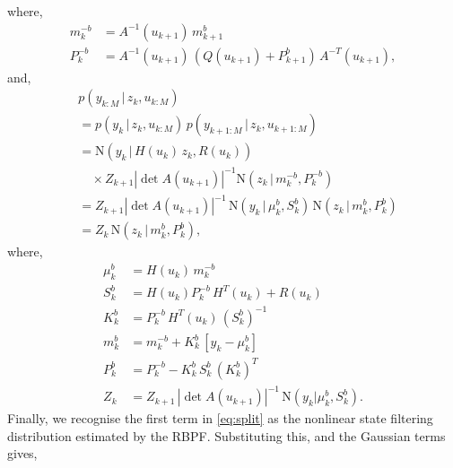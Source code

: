 \documentclass[twocolumn]{autart}    %
\begin{document}
%
where,
%
\begin{equation}
\begin{split}
   m^{-b}_k &= A^{-1}(u_{k+1}) \, m^b_{k+1} \\
   P^{-b}_k &= A^{-1}(u_{k+1}) \, (Q(u_{k+1}) + P^b_{k+1}) \, A^{-T}(u_{k+1}),
\end{split}
\label{eq:bkf_predict}
\end{equation}
%
and,
%
\begin{equation}
\begin{split}
  &p(y_{k:M} \,|\, z_{k},u_{k:M}) \\
  &= p(y_{k} \,|\, z_{k},u_{k:M}) \, p(y_{k+1:M} \,|\, z_{k},u_{k+1:M}) \\
  &= \mathrm{N}(y_{k} \,|\, H(u_k) \, z_k, R(u_k)) \\
  &\quad \times Z_{k+1} |\det A(u_{k+1})|^{-1}
  \mathrm{N}(z_{k} \,|\, m^{-b}_{k}, P^{-b}_{k}) \\
  &= Z_{k+1} |\det A(u_{k+1})|^{-1} \, \mathrm{N}(y_{k} \,|\, \mu^b_k, S^b_k) \,
     \mathrm{N}(z_{k} \,|\, m^{b}_{k}, P^{b}_{k}) \\
  &= Z_{k} \,
     \mathrm{N}(z_{k} \,|\, m^{b}_{k}, P^{b}_{k}),
\end{split}
\end{equation}
%
where,
%
\begin{equation}
\begin{split}
    \mu^b_k &= H(u_k) \, m^{-b}_k \\
      S^b_k &= H(u_k) P^{-b}_k \, H^T(u_k) + R(u_k) \\
      K^b_k &= P^{-b}_k \, H^T(u_k) \, (S^b_k)^{-1} \\
      m^b_k &= m^{-b}_k + K^b_k \, [y_k - \mu^b_k] \\
      P^b_k &= P^{-b}_k - K^b_k \, S^b_k \, (K^b_k)^T \\
        Z_k &= Z_{k+1} \, |\det A(u_{k+1})|^{-1} \,
               \mathrm{N}(y_k | \mu^b_k,S^b_k).
\end{split}
\end{equation}
%
Finally, we recognise the first term in \eqref{eq:split} as the nonlinear state filtering distribution estimated by the RBPF. Substituting this, and the Gaussian terms gives,
%
\end{document}
